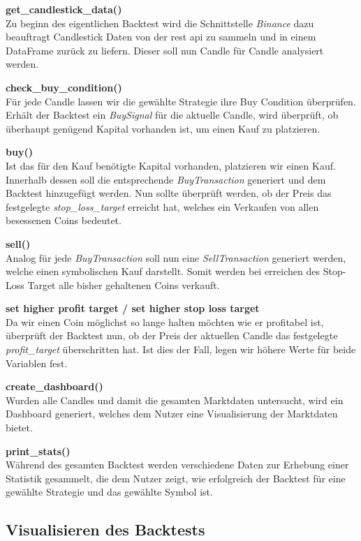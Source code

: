 \documentclass[oneside]{ausarbeitung}
\begin{document}
\textbf{get\_candlestick\_data()} \\
Zu beginn des eigentlichen Backtest wird die Schnittstelle \textit{Binance} dazu beauftragt Candlestick Daten von der \ac{rest} \ac{api} zu sammeln und in einem DataFrame zurück zu liefern. Dieser soll nun Candle für Candle analysiert werden.

\textbf{check\_buy\_condition()} \\
Für jede Candle lassen wir die gewählte Strategie ihre Buy Condition überprüfen. Erhält der Backtest ein \textit{BuySignal} für die aktuelle Candle, wird überprüft, ob überhaupt genügend Kapital vorhanden ist, um einen Kauf zu platzieren.

\textbf{buy()} \\
Ist das für den Kauf benötigte Kapital vorhanden, platzieren wir einen Kauf. Innerhalb dessen soll die entsprechende \textit{BuyTransaction} generiert und dem Backtest hinzugefügt werden. Nun sollte überprüft werden, ob der Preis das festgelegte \textit{stop\_loss\_target} erreicht hat, welches ein Verkaufen von allen besessenen Coins bedeutet.

\textbf{sell()} \\
Analog für jede \textit{BuyTransaction} soll nun eine \textit{SellTransaction} generiert werden, welche einen symbolischen Kauf darstellt. Somit werden bei erreichen des Stop-Loss Target alle bisher gehaltenen Coins verkauft.

\textbf{set higher profit target / set higher stop loss target} \\
Da wir einen Coin möglichst so lange halten möchten wie er profitabel ist, überprüft der Backtest nun, ob der Preis der aktuellen Candle das festgelegte \textit{profit\_target} überschritten hat. Ist dies der Fall, legen wir höhere Werte für beide Variablen fest.

\textbf{create\_dashboard()} \\
Wurden alle Candles und damit die gesamten Marktdaten untersucht, wird ein Dashboard generiert, welches dem Nutzer eine Visualisierung der Marktdaten bietet. 

\textbf{print\_stats()} \\
Während des gesamten Backtest werden verschiedene Daten zur Erhebung einer Statistik gesammelt, die dem Nutzer zeigt, wie erfolgreich der Backtest für eine gewählte Strategie und das gewählte Symbol ist.

\subsection{Visualisieren des Backtests}
\label{sub:visualisieren_des_backtests}
\end{document}
